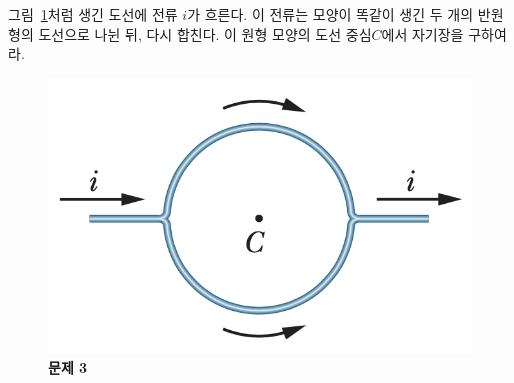 \documentclass[tightenlines,floatfix,nofootinbib,superscriptaddress,fleqn]{revtex4}
\begin{document}
\vspace{1cm}

그림~\ref{fig:3}처럼 생긴 도선에 전류 $i$가 흐른다. 이 전류는 모양이
똑같이 생긴 두 개의 반원형의 도선으로 나뉜 뒤, 다시 합친다. 이 원형
모양의 도선 중심$C$에서 자기장을 구하여라. 
\begin{figure}[htp]
  \centering
  \includegraphics[scale=0.55]{qfig10-1.png}
  \caption{\textbf{문제 3}}
  \label{fig:3}
\end{figure}
\end{document}

